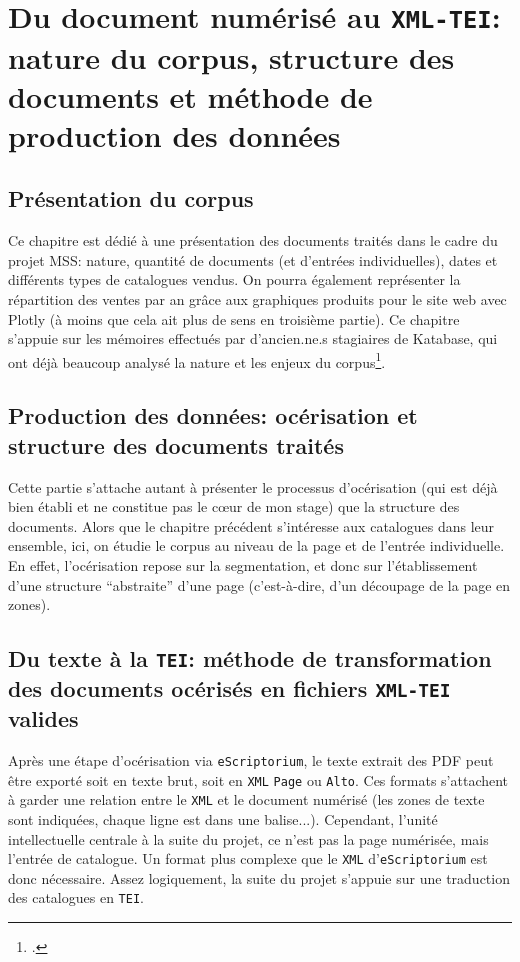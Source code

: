 \documentclass[a4paper, 12pt, twoside]{book}
\newcommand{\alto}{\texttt{Alto}}
\newcommand{\escr}{\texttt{eScriptorium}}
\newcommand{\tei}{\texttt{TEI}}
\newcommand{\xml}{\texttt{XML}}
\newcommand{\xmltei}{\texttt{XML-TEI}}
\begin{document}
\part{Du document numérisé au \xmltei: nature du corpus, structure des documents et méthode de production des données}
\chapter{Présentation du corpus}
Ce chapitre est dédié à une présentation des documents traités dans le cadre du projet MSS: nature, quantité de documents (et d'entrées individuelles), dates et différents types de catalogues vendus. On pourra également représenter la répartition des ventes par an grâce aux graphiques produits pour le site web avec Plotly (à moins que cela ait plus de sens en troisième partie). Ce chapitre s'appuie sur les mémoires effectués par d'ancien.ne.s stagiaires de Katabase, qui ont déjà beaucoup analysé la nature et les enjeux du corpus\footcite{rondeau_du_noyer_encoder_2019, corbieres_du_2020, janes_du_2021}.

\chapter{Production des données: océrisation et structure des documents traités}
Cette partie s'attache autant à présenter le processus d'océrisation (qui est déjà bien établi et ne constitue pas le cœur de mon stage) que la structure des documents. Alors que le chapitre précédent s'intéresse aux catalogues dans leur ensemble, ici, on étudie le corpus au niveau de la page et de l'entrée individuelle. En effet, l'océrisation repose sur la segmentation, et donc sur l'établissement d'une structure \enquote{abstraite} d'une page (c'est-à-dire, d'un découpage de la page en zones).

\chapter{Du texte à la \tei{}: méthode de transformation des documents océrisés en fichiers \xmltei{} valides}
\chaptermark{Du texte à la \tei{}}
Après une étape d'océrisation via \escr{}, le texte extrait des PDF peut être exporté soit en texte brut, soit en \xml{} \texttt{Page} ou \alto{}. Ces formats s'attachent à garder une relation entre le \xml{} et le document numérisé (les zones de texte sont indiquées, chaque ligne est dans une balise...). Cependant, l'unité intellectuelle centrale à la suite du projet, ce n'est pas la page numérisée, mais l'entrée de catalogue. Un format plus complexe que le \xml{} d'\escr{} est donc nécessaire. Assez logiquement, la suite du projet s'appuie sur une traduction des catalogues en \tei{}. 
\end{document}
